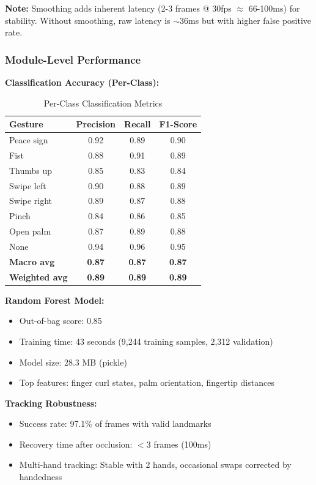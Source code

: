 \documentclass[11pt,a4paper]{article}
\begin{document}
\textbf{Note:} Smoothing adds inherent latency (2-3 frames @ 30fps $\approx$ 66-100ms) for stability. Without smoothing, raw latency is $\sim$36ms but with higher false positive rate.

\subsubsection{Module-Level Performance}

\textbf{Classification Accuracy (Per-Class):}
\begin{table}[H]
\centering
\small
\begin{tabular}{@{}lccc@{}}
\toprule
\textbf{Gesture} & \textbf{Precision} & \textbf{Recall} & \textbf{F1-Score} \\
\midrule
Peace sign & 0.92 & 0.89 & 0.90 \\
Fist & 0.88 & 0.91 & 0.89 \\
Thumbs up & 0.85 & 0.83 & 0.84 \\
Swipe left & 0.90 & 0.88 & 0.89 \\
Swipe right & 0.89 & 0.87 & 0.88 \\
Pinch & 0.84 & 0.86 & 0.85 \\
Open palm & 0.87 & 0.89 & 0.88 \\
None & 0.94 & 0.96 & 0.95 \\
\midrule
\textbf{Macro avg} & \textbf{0.87} & \textbf{0.87} & \textbf{0.87} \\
\textbf{Weighted avg} & \textbf{0.89} & \textbf{0.89} & \textbf{0.89} \\
\bottomrule
\end{tabular}
\caption{Per-Class Classification Metrics}
\end{table}

\textbf{Random Forest Model:}
\begin{itemize}
\item Out-of-bag score: 0.85
\item Training time: 43 seconds (9,244 training samples, 2,312 validation)
\item Model size: 28.3 MB (pickle)
\item Top features: finger curl states, palm orientation, fingertip distances
\end{itemize}

\textbf{Tracking Robustness:}
\begin{itemize}
\item Success rate: 97.1\% of frames with valid landmarks
\item Recovery time after occlusion: $<$3 frames (100ms)
\item Multi-hand tracking: Stable with 2 hands, occasional swaps corrected by handedness
\end{itemize}
\end{document}
